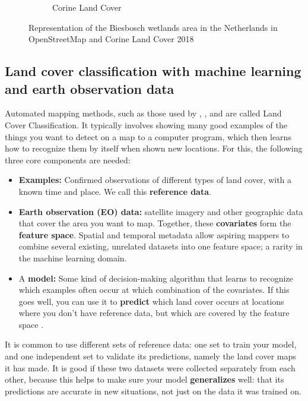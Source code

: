 \begin{figure}[H]
\begin{subfigure}[b]{0.48\textwidth}
            \caption{Corine Land Cover}
            \label{fig:biesbosch_clc}
        \end{subfigure}
        \caption{Representation of the Biesbosch wetlands area in the Netherlands in OpenStreetMap and Corine Land Cover 2018}
        \label{fig:biesbosch_osm_clc} %
        \end{figure}

\subsection{Land cover classification with machine learning and earth observation data}
    
    Automated mapping methods, such as those used by \citet{pflugmacher2019mapping}, \citet{dandrimont2021parcel}, \citet{luo2022developing} and \citet{malinowski2020automated} are called Land Cover Classification. It typically involves showing many good examples of the things you want to detect on a map to a computer program, which then learns how to recognize them by itself when shown new locations. For this, the following three core components are needed:
    
    \begin{itemize}
        \item \textbf{Examples:} Confirmed observations of different types of land cover, with a known time and place. We call this \textbf{reference data}.
        \item \textbf{Earth observation (EO) data:} satellite imagery and other geographic data that cover the area you want to map. Together, these \textbf{covariates} form the \textbf{feature space}. Spatial and temporal metadata allow aspiring mappers to combine several existing, unrelated datasets into one feature space; a rarity in the machine learning domain.
        \item A \textbf{model:} Some kind of decision-making algorithm that learns to recognize which examples often occur at which combination of the covariates. If this goes well, you can use it to \textbf{predict} which land cover occurs at locations where you don't have reference data, but which are covered by the feature space \citep{meyer2021predicting}.
    \end{itemize}
    
    It is common to use different sets of reference data: one set to train your model, and one independent set to validate its predictions, namely the land cover maps it has made. It is good if these two datasets were collected separately from each other, because this helps to make sure your model \textbf{generalizes} well: that its predictions are accurate in new situations, not just on the data it was trained on.

